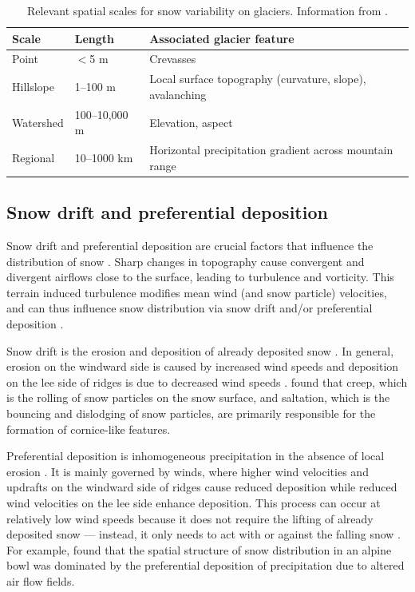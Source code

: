 \documentclass[12pt]{article}
\begin{document}
\begin{table}[]
\centering
\caption{Relevant spatial scales for snow variability on glaciers. Information from \cite{Clark2011}.}
\label{scale}
\begin{tabular}{lll}
\textbf{Scale} & \textbf{Length} & \textbf{Associated glacier feature}                     \\ \hline
Point          & $<$5 m         & Crevasses                                               \\
Hillslope      & 1--100 m        & Local surface topography (curvature, slope), avalanching        \\
Watershed      & 100--10,000 m   & Elevation, aspect                                       \\
Regional       & 10--1000 km     & Horizontal precipitation gradient across mountain range
\end{tabular}
\end{table}

\subsection{Snow drift and preferential deposition}
Snow drift and preferential deposition are crucial factors that influence the distribution of snow \citep{Lehning2008, Winstral2002, Clark2011}. Sharp changes in topography cause convergent and divergent airflows close to the surface, leading to turbulence and vorticity. This terrain induced turbulence modifies mean wind (and snow particle) velocities, and can thus influence snow distribution via snow drift and/or preferential deposition \citep{Mott2008, Lehning2008, Dadic2010}.

Snow drift is the erosion and deposition of already deposited snow \citep{Dadic2010}. In general, erosion on the windward side is caused by increased wind speeds and deposition on the lee side of ridges is due to decreased wind speeds \citep{Liston1998, Mott2008, Dadic2010}. \cite{Mott2010} found that creep, which is the rolling of snow particles on the snow surface, and saltation, which is the bouncing and dislodging of snow particles, are primarily responsible for the formation of cornice-like features. 

Preferential deposition is inhomogeneous precipitation in the absence of local erosion \citep{Lehning2008}. It is mainly governed by winds, where higher wind velocities and updrafts on the windward side of ridges cause reduced deposition while reduced wind velocities on the lee side enhance deposition. This process can occur at relatively low wind speeds because it does not require the lifting of already deposited snow  --- instead, it only needs to act with or against the falling snow \citep{Mott2008, Dadic2010}. For example, \cite{Mott2011} found that the spatial structure of snow distribution in an alpine bowl was dominated by the preferential deposition of precipitation due to altered air flow fields. 
\end{document}
